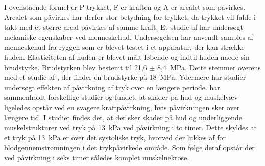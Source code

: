 I ovenstående formel er P trykket, F er kraften og A er arealet som påvirkes. Arealet som påvirkes har derfor stor betydning for trykket, da trykket vil falde i takt med et større areal påvirkes af samme kraft. Et studie af  har undersøgt mekaniske egenskaber ved menneskehud. Undersøgelsen har anvendt samples af menneskehud fra ryggen som er blevet testet i et apparatur, der kan strække huden. Elasticiteten af huden er blevet målt løbende og indtil huden nåede sin brudstyrke. Brudstyrken blev bestemt til 21,6 $\pm$ 8,4~MPa. Dette stemmer overens med et studie af , der finder en brudstyrke på 18~MPa. Ydermere har studier undersøgt effekten af påvirkning af tryk over en længere periode.  har sammenholdt forskellige studier og fundet, at skader på hud og muskelvæv ligeledes opstår ved en svagere kraftpåvirkning, hvis påvirkningen sker over længere tid. I studiet findes det, at der sker skader på hud og underliggende muskelstrukturer ved tryk på 13~kPa ved påvirkning i to timer. Dette skyldes at et tryk på 13~kPa er over det systoliske tryk, hvorved der lukkes af for blodgennemstrømningen i det trykpåvirkede område. Som følge deraf opstår der ved påvirkning i seks timer således komplet muskelnekrose. \citep{sanders1995} 

